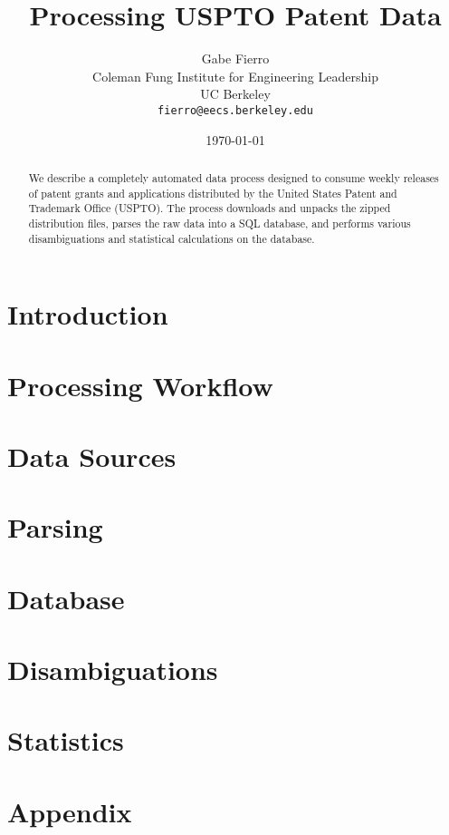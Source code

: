 \documentclass[11pt, twocolumn]{article}
\begin{document}
\title{Processing USPTO Patent Data}
\author{Gabe Fierro\\
	Coleman Fung Institute for Engineering Leadership\\
	UC Berkeley\\
	\texttt{fierro@eecs.berkeley.edu}}
\date{\today}
\maketitle

\begin{abstract}
We describe a completely automated data process designed to consume weekly releases of patent grants and applications distributed by the United States Patent and Trademark Office (USPTO). The process downloads and unpacks the zipped distribution files, parses the raw data into a SQL database, and performs various disambiguations and statistical calculations on the database.
\end{abstract}

\section{Introduction}

\section{Processing Workflow}

\section{Data Sources}

\section{Parsing}

\section{Database}

\section{Disambiguations}

\section{Statistics}


{
\scriptsize


}

\section*{Appendix}

\end{document}
